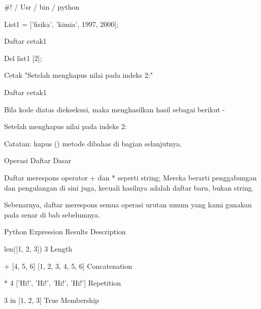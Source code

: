 \vspace{12pt}
 $  \#  $! / Usr / bin / python \par
\vspace{12pt}
List1 = ['fisika', 'kimia', 1997, 2000]; \par
\vspace{12pt}
Daftar cetak1 \par
\vspace{12pt}
Del list1 [2]; \par
\vspace{12pt}
Cetak "Setelah menghapus nilai pada indeks 2:" \par
\vspace{12pt}
Daftar cetak1 \par
Bila kode diatas dieksekusi, maka menghasilkan hasil sebagai berikut - \par
['Fisika', 'kimia', 1997, 2000] \par
Setelah menghapus nilai pada indeks 2: \par
['Fisika', 'kimia', 2000] \par
Catatan: hapus () metode dibahas di bagian selanjutnya. \par
Operasi Daftar Dasar \par
Daftar merespons operator + dan * seperti string; Mereka berarti penggabungan dan pengulangan di sini juga, kecuali hasilnya adalah daftar baru, bukan string. \par
Sebenarnya, daftar merespons semua operasi urutan umum yang kami gunakan pada senar di bab sebelumnya. \par
Python Expression \hspace*{0.5in} Results  \hspace*{0.5in} Description \par
len([1, 2, 3]) \hspace*{0.5in} 3 \hspace*{0.5in} Length \par
[1, 2, 3] + [4, 5, 6] \hspace*{0.5in} [1, 2, 3, 4, 5, 6] \hspace*{0.5in} Concatenation \par
['Hi!'] * 4 \hspace*{0.5in} ['Hi!', 'Hi!', 'Hi!', 'Hi!'] \hspace*{0.5in} Repetition \par
3 in [1, 2, 3] \hspace*{0.5in} True \hspace*{0.5in} Membership \par
